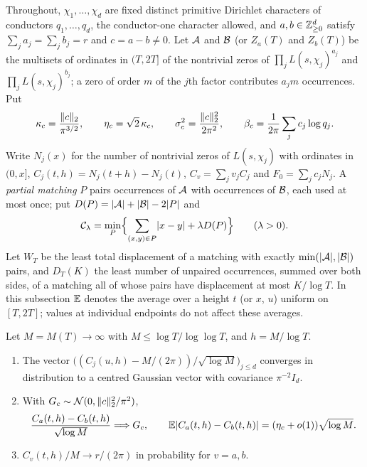 Throughout, $\chi_1,\dots,\chi_d$ are fixed distinct primitive Dirichlet characters of conductors
$q_1,\dots,q_d$, the conductor-one character allowed, and $a,b\in\mathbb{Z}_{\ge0}^d$ satisfy
$\sum_ja_j=\sum_jb_j=r$ and $c=a-b\ne0$. Let $\mathcal{A}$ and $\mathcal{B}$ (or $Z_a(T)$ and $Z_b(T)$) be the multisets of
ordinates in $(T,2T]$ of the nontrivial zeros of $\prod_jL(s,\chi_j)^{a_j}$ and $\prod_jL(s,\chi_j)^{b_j}$; a zero
of order $m$ of the $j$th factor contributes $a_jm$ occurrences. Put
\[
 \kappa_c=\frac{\lVert c\rVert_2}{\pi^{3/2}},\qquad \eta_c=\sqrt2\,\kappa_c,\qquad \sigma_c^2=\frac{\lVert c\rVert_2^2}{2\pi^2},\qquad
 \beta_c=\frac1{2\pi}\sum_jc_j\log q_j .
\]
Write $N_j(x)$ for the number of nontrivial zeros of $L(s,\chi_j)$ with ordinates in $(0,x]$,
$C_j(t,h)=N_j(t+h)-N_j(t)$, $C_v=\sum_jv_jC_j$ and $F_0=\sum_jc_jN_j$. A \emph{partial matching} $P$ pairs
occurrences of $\mathcal{A}$ with occurrences of $\mathcal{B}$, each used at most once; put $D(P)=\lvert\mathcal{A}\rvert+\lvert\mathcal{B}\rvert-2\lvert P\rvert$ and
\[
 \mathcal{C}_\lambda=\min_P\Bigl\{\sum_{(x,y)\in P}\lvert x-y\rvert+\lambda D(P)\Bigr\}\qquad(\lambda>0).
\]
Let $W_T$ be the least total displacement of a matching with exactly $\min(\lvert\mathcal{A}\rvert,\lvert\mathcal{B}\rvert)$ pairs, and $D_T(K)$
the least number of unpaired occurrences, summed over both sides, of a matching all of whose pairs have
displacement at most $K/\log T$. In this subsection $\mathbb{E}$ denotes the average over a height $t$ (or $x$, $u$)
uniform on $[T,2T]$; values at individual endpoints do not affect these averages.

\begin{lemma}\label{chz:lem:bpclt}
Let $M=M(T)\to\infty$ with $M\le\log T/\log\log T$, and $h=M/\log T$.
\begin{enumerate}[label=\textup{(\roman*)}]
\item The vector $\bigl((C_j(u,h)-M/(2\pi))/\sqrt{\log M}\bigr)_{j\le d}$ converges in distribution to a centred Gaussian
vector with covariance $\pi^{-2}I_d$.
\item With $G_c\sim\mathcal N(0,\lVert c\rVert_2^2/\pi^2)$,
\[
 \frac{C_a(t,h)-C_b(t,h)}{\sqrt{\log M}}\Longrightarrow G_c,\qquad \mathbb{E}\lvert C_a(t,h)-C_b(t,h)\rvert=(\eta_c+o(1))\sqrt{\log M}.
\]
\item $C_v(t,h)/M\to r/(2\pi)$ in probability for $v=a,b$.
\end{enumerate}
\end{lemma}

